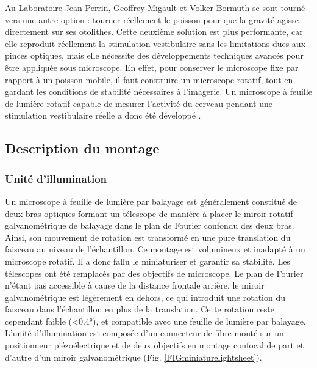 Au Laboratoire Jean Perrin, Geoffrey Migault et Volker Bormuth se sont tourné vers une autre option : tourner réellement le poisson pour que la gravité agisse directement sur ses otolithes.
Cette deuxième solution est plus performante, car elle reproduit réellement la stimulation vestibulaire sans les limitations dues aux pinces optiques, mais elle nécessite des développements techniques avancés pour être appliquée sous microscope. En effet, pour conserver le microscope fixe par rapport à un poisson mobile, il faut construire un microscope rotatif, tout en gardant les conditions de stabilité nécessaires à l'imagerie. Un microscope à feuille de lumière rotatif capable de mesurer l'activité du cerveau pendant une stimulation vestibulaire réelle a donc été développé \cite{migault_whole-brain_2018}.

\subsection{Description du montage}

\subsubsection{Unité d'illumination}

Un microscope à feuille de lumière par balayage est généralement constitué de deux bras optiques formant un télescope de manière à placer le miroir rotatif galvanométrique de balayage dans le plan de Fourier confondu des deux bras. Ainsi, son mouvement de rotation est transformé en une pure translation du faisceau au niveau de l'échantillon. Ce montage est volumineux et inadapté à un microscope rotatif. Il a donc fallu le miniaturiser et garantir sa stabilité. Les télescopes ont été remplacés par des objectifs de microscope. Le plan de Fourier n'étant pas accessible à cause de la distance frontale arrière, le miroir galvanométrique est légèrement en dehors, ce qui introduit une rotation du faisceau dans l'échantillon en plus de la translation. Cette rotation reste cependant faible (<0.4°), et compatible avec une feuille de lumière par balayage.  
L'unité d'illumination est composée d'un connecteur de fibre monté sur un positionneur piézoélectrique et de deux objectifs en montage confocal de part et d'autre d'un miroir galvanométrique (Fig. \ref{FIGminiaturelightsheet}).

